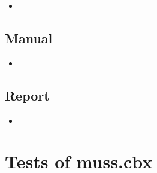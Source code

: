 \begin{itemize}
\item {}
\end{itemize}

\subsection{Manual}

\begin{itemize}
\item {}
\end{itemize}

\subsection{Report}

\begin{itemize}
\item {}
\end{itemize}


\newpage

\section{Tests of muss.cbx}

